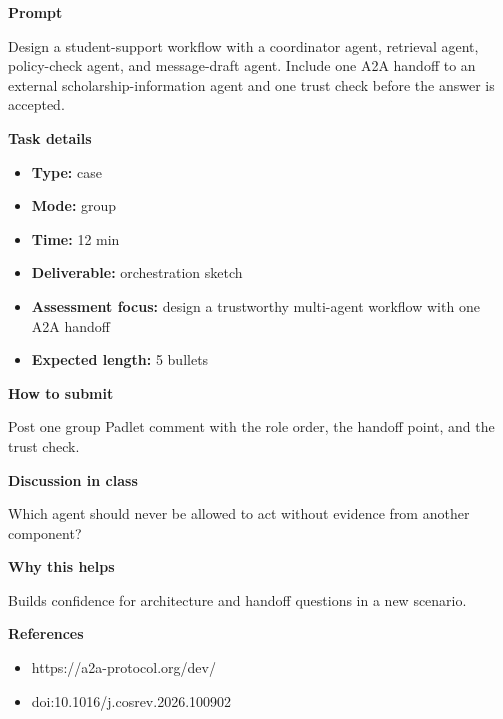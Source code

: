 \documentclass[11pt]{article}
\begin{document}
\begin{tcolorbox}[colback=white,colframe=MidnightBlue,title={Q6 Multi-Agent and A2A Design},fonttitle=\bfseries,breakable]
\begin{center}
\end{center}

{\large\bfseries\color{MidnightBlue} Prompt}\par\medskip
Design a student-support workflow with a coordinator agent, retrieval agent, policy-check agent, and message-draft agent. Include one A2A handoff to an external scholarship-information agent and one trust check before the answer is accepted.

{\large\bfseries\color{MidnightBlue} Task details}\par\medskip
\begin{itemize}\item \textbf{Type:} case
\item \textbf{Mode:} group
\item \textbf{Time:} 12 min
\item \textbf{Deliverable:} orchestration sketch
\item \textbf{Assessment focus:} design a trustworthy multi-agent workflow with one A2A handoff
\item \textbf{Expected length:} 5 bullets\end{itemize}

{\large\bfseries\color{MidnightBlue} How to submit}\par\medskip
Post one group Padlet comment with the role order, the handoff point, and the trust check.

{\large\bfseries\color{MidnightBlue} Discussion in class}\par\medskip
Which agent should never be allowed to act without evidence from another component?

{\large\bfseries\color{MidnightBlue} Why this helps}\par\medskip
Builds confidence for architecture and handoff questions in a new scenario.

{\large\bfseries\color{MidnightBlue} References}\par\medskip
\begin{itemize}\item https://a2a-protocol.org/dev/
\item doi:10.1016/j.cosrev.2026.100902\end{itemize}
\end{tcolorbox}
\end{document}
